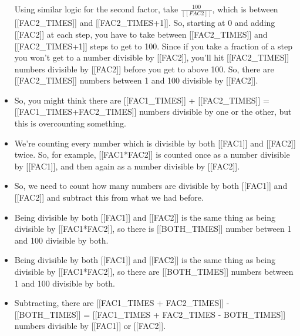\documentclass{article}
\begin{document}
\begin{itemize}
                            
                                Using similar logic for the second factor, take  $\frac{100}{[[FAC2]]}$, which is between [[FAC2\_TIMES]] and [[FAC2\_TIMES+1]]. So, starting at 0 and adding [[FAC2]]
                                at each step, you have to take between [[FAC2\_TIMES]] and [[FAC2\_TIMES+1]] steps to get
                                to 100. Since if you take a fraction of a step you won't get to a number divisible by [[FAC2]],
                                you'll hit [[FAC2\_TIMES]] numbers divisible by [[FAC2]] before you get to above 100.
                                So, there are [[FAC2\_TIMES]] numbers between 1 and 100 divisible by [[FAC2]].
  \item So, you might think there are [[FAC1\_TIMES]] + [[FAC2\_TIMES]] = [[FAC1\_TIMES+FAC2\_TIMES]]
                        numbers divisible by one or the other, but this is overcounting something.
  \item We're counting every number which is divisible by both [[FAC1]] and [[FAC2]] twice.
                        So, for example, [[FAC1*FAC2]] is counted once as a number divisible by [[FAC1]], and then again as a number divisible by [[FAC2]].
  \item So, we need to count how many numbers are divisible by both [[FAC1]] and [[FAC2]]
                        and subtract this from what we had before.
  \item Being divisible by both [[FAC1]] and [[FAC2]] is the same thing as being divisible by
                        [[FAC1*FAC2]], so there is [[BOTH\_TIMES]] number between 1 and 100 divisible by both.
  \item Being divisible by both [[FAC1]] and [[FAC2]] is the same thing as being divisible by
                        [[FAC1*FAC2]], so there are [[BOTH\_TIMES]] numbers between 1 and 100 divisible by both.
  \item Subtracting, there are [[FAC1\_TIMES + FAC2\_TIMES]] - [[BOTH\_TIMES]] = [[FAC1\_TIMES + FAC2\_TIMES - BOTH\_TIMES]] numbers divisible by [[FAC1]] or [[FAC2]].
\end{itemize}
\end{document}
